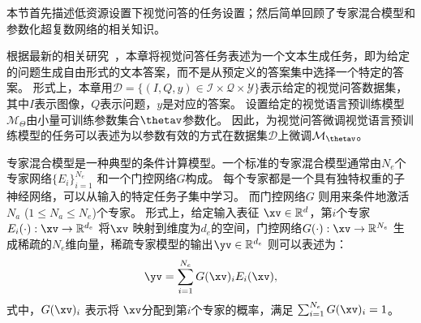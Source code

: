 
本节首先描述低资源设置下视觉问答的任务设置；然后简单回顾了专家混合模型和参数化超复数网络的相关知识。

根据最新的相关研究~\cite{cho2021unifying,wang2022simvlm}，本章将视觉问答任务表述为一个文本生成任务，即为给定的问题生成自由形式的文本答案，而不是从预定义的答案集中选择一个特定的答案。
形式上，本章用$\mathcal{D}=\{(I, Q, y)\in \mathcal{I}\times \mathcal{Q}\times \mathcal{Y} \}$表示给定的视觉问答数据集，其中$I$表示图像，$Q$表示问题，$y$是对应的答案。
设置给定的视觉语言预训练模型$\mathcal{M}_{\Theta}$由小量可训练参数集合$\thetav$参数化。
因此，为视觉问答微调视觉语言预训练模型的任务可以表述为以参数有效的方式在数据集$\mathcal{D}$上微调$\mathcal{M}_{\thetav}$。 

专家混合模型是一种典型的条件计算模型。一个标准的专家混合模型通常由$N_e$个专家网络$\{{E}_i\}_{i=1}^{N_e}$ 和一个门控网络${G}$构成。
每个专家都是一个具有独特权重的子神经网络，可以从输入的特定任务子集中学习。
而门控网络${G}$ 则用来条件地激活$N_a$ ($1\le N_a \le N_e$)个专家。
形式上，给定输入表征 $\xv \in \mathbb{R}^{d}$，第$i$个专家${E}_i(\cdot): \xv \rightarrow \mathbb{R}^{d_e}$ 将$\xv$ 映射到维度为$d_e$的空间，门控网络${G}(\cdot): \xv \rightarrow \mathbb{R}^{N_e}$ 生成稀疏的${N_e}$维向量，稀疏专家模型的输出$\yv \in \mathbb{R}^{d_e}$ 则可以表述为：
\begin{equation} 
\begin{aligned} 
\yv = \sum_{i=1}^{N_e} {G}(\xv)_i {E}_i(\xv),
\end{aligned}
\label{eq:moe} 
\end{equation}
式中，${G}(\xv)_i$ 表示将 $\xv$分配到第$i$个专家的概率，满足 $\sum_{i=1}^{N_e} {G}(\xv)_i = 1$。

